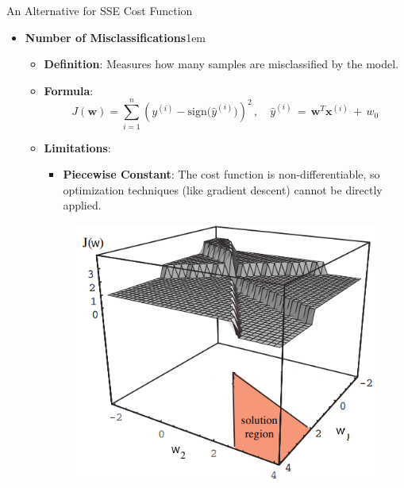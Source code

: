 \documentclass[serif, aspectratio=169]{beamer}
\begin{document}
\begin{frame}{An Alternative for SSE Cost Function}
    \begin{itemize}
        \item \textbf{Number of Misclassifications}\itemsep1em
        \medskip
        \begin{itemize}\itemsep0.8em
            \item \textbf{Definition}:
            Measures how many samples are misclassified by the model.
            \item \textbf{Formula}:
                \[
                J(\mathbf{w}) = \sum_{i=1}^{n} (y^{(i)} - \text{sign(\(\hat{y}^{(i)})\)})^2 \, , \quad \hat{y}^{(i)} \, = \, \mathbf{w}^T\mathbf{x}^{(i)} \, + \, w_0
                \]
            \item \textbf{Limitations}: \\
            \begin{itemize}
                \item \justifying \textbf{Piecewise Constant}:
                The cost function is non-differentiable, so optimization techniques (like gradient descent) cannot be directly applied.
            \end{itemize}
            \endminipage
            \hspace{1cm}
            \begin{figure}[bh]
                \includegraphics[width=\textwidth]{pic/Figure_12.png}
            \end{figure}
            \endminipage
        \end{itemize}
    \end{itemize}
\end{frame}
\end{document}
